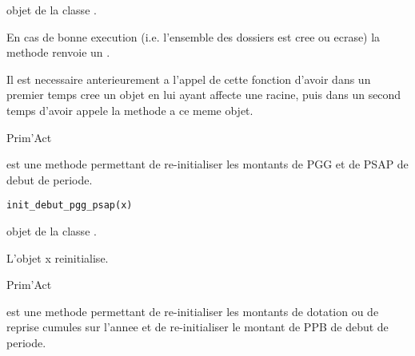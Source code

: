 \documentclass[a4paper]{book}
\begin{document}
%
\begin{Arguments}
\begin{ldescription}
\item[\code{x}] objet de la classe .
\end{ldescription}
\end{Arguments}
%
\begin{Value}
En cas de bonne execution (i.e. l'ensemble des dossiers est cree ou ecrase) la methode renvoie un .
\end{Value}
%
\begin{Note}\relax
Il est necessaire anterieurement a l'appel de cette fonction d'avoir dans un premier temps
cree un objet  en lui ayant affecte une racine,
puis dans un second temps d'avoir appele la methode  a ce meme objet.
\end{Note}
%
\begin{Author}\relax
Prim'Act
\end{Author}
%
\begin{Description}\relax
{} est une methode permettant de re-initialiser les montants
de PGG et de PSAP de debut de periode.
\end{Description}
%
\begin{Usage}
\begin{verbatim}
init_debut_pgg_psap(x)
\end{verbatim}
\end{Usage}
%
\begin{Arguments}
\begin{ldescription}
\item[\code{x}] objet de la classe .
\end{ldescription}
\end{Arguments}
%
\begin{Value}
L'objet x reinitialise.
\end{Value}
%
\begin{Author}\relax
Prim'Act
\end{Author}
%
\begin{Description}\relax
{} est une methode permettant de re-initialiser les montants de
dotation ou de reprise cumules sur l'annee et
de re-initialiser le montant de PPB de debut de periode.
\end{Description}
\end{document}
